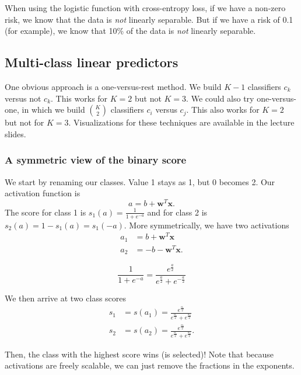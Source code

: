 \documentclass[titlepage, 12pt, leqno]{article}
\begin{document}
\begin{note}
    When using the logistic function with cross-entropy loss, if we have a
    non-zero risk, we know that the data is \textit{not} linearly separable. But
    if we have a risk of 0.1 (for example), we know that 10\% of the data is
    \textit{not} linearly separable.
\end{note}

\subsection{Multi-class linear predictors}
One obvious approach is a one-versus-rest method. We build $K-1$ classifiers
$c_{k}$ versus not $c_{k}$. This works for $K=2$ but not $K=3$. We could also
try one-versus-one, in which we build $\binom{K}{2}$ classifiers $c_{i}$ versus
$c_{j}$. This also works for $K=2$ but not for $K=3$. Visualizations for these
techniques are available in the lecture slides.

\subsubsection{A symmetric view of the binary score}
We start by renaming our classes. Value 1 stays as 1, but 0 becomes 2. Our 
activation function is
\[
a = b+\textbf{w}^{T}\textbf{x}.
\]
The score for class 1 is $s_{1}(a) = \frac{1}{1 + e^{-a}}$ and for class 2 is
$s_{2}(a) = 1 - s_{1}(a) = s_{1}(-a)$. More symmetrically, we have two activations
\begin{align*}
    a_{1} &= b+\textbf{w}^{T}\textbf{x}\\
    a_{2} &= -b - \textbf{w}^{T}\textbf{x}.
\end{align*}
\begin{note}
    \[
    \frac{1}{1+e^{-a}} = \frac{e^{\frac{a}{2}}}{e^{\frac{a}{2}}+ e^{-\frac{a}{2}}}
    \]
\end{note}
We then arrive at two class scores
\begin{align*}
    s_{1} &= s(a_{1}) = \frac{e^{\frac{a_{1}}{2}}}{e^{\frac{a_{1}}{2}}+
        e^{\frac{a_{2}}{2}}}\\
        s_{2} &= s(a_{2}) = \frac{e^{\frac{a_{2}}{2}}}{e^{\frac{a_{1}}{2}}+
        e^{\frac{a_{2}}{2}}}.
\end{align*}

Then, the class with the highest score wins (is selected)! Note that because
activations are freely scalable, we can just remove the fractions in the
exponents. 
\end{document}
